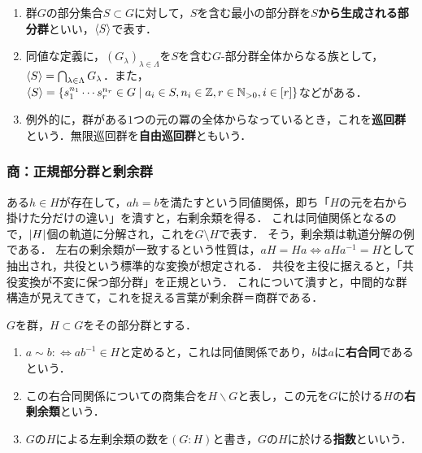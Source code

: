 \documentclass[uplatex,dvipdfmx]{jsreport}
\begin{document}
\begin{definition}\mbox{}
    \begin{enumerate}
        \item 群$G$の部分集合$S\subset G$に対して，$S$を含む最小の部分群を\textbf{$S$から生成される部分群}といい，$\langle S\rangle$で表す．
        \item 同値な定義に，$(G_\lambda)_{\lambda\in\Lambda}$を$S$を含む$G$-部分群全体からなる族として，$\langle S\rangle=\bigcap_{\lambda\in\Lambda} G_\lambda$．また，$\langle S\rangle=\{s_1^{n_1}\cdots s_r^{n_r}\in G\mid a_i\in S,n_i\in\mathbb{Z},r\in\mathbb{N}_{>0},i\in[r]\}$などがある．
        \item 例外的に，群がある$1$つの元の冪の全体からなっているとき，これを\textbf{巡回群}という．無限巡回群を\textbf{自由巡回群}ともいう．
    \end{enumerate}
\end{definition}

\subsubsection{商：正規部分群と剰余群}

\begin{tcolorbox}[colframe=ForestGreen, colback=ForestGreen!10!white, breakable ,colbacktitle=ForestGreen!40!white, coltitle=black,fonttitle=\bfseries\sffamily,
    title=]
    ある$h\in H$が存在して，$ah=b$を満たすという同値関係，即ち「$H$の元を右から掛けた分だけの違い」を潰すと，右剰余類を得る．
    これは同値関係となるので，$\lvert H\rvert$個の軌道に分解され，これを$G\setminus H$で表す．
    そう，剰余類は軌道分解の例である．
    左右の剰余類が一致するという性質は，$aH=Ha\Leftrightarrow aHa^{-1}=H$として抽出され，共役という標準的な変換が想定される．
    共役を主役に据えると，「共役変換が不変に保つ部分群」を正規という．
    これについて潰すと，中間的な群構造が見えてきて，これを捉える言葉が剰余群＝商群である．
\end{tcolorbox}

\begin{definition}
    $G$を群，$H\subset G$をその部分群とする．
    \begin{enumerate}
        \item $a\sim b:\Leftrightarrow ab^{-1}\in H$と定めると，これは同値関係であり，$b$は$a$に\textbf{右合同}であるという．
        \item この右合同関係についての商集合を$H\backslash G$と表し，この元を$G$に於ける$H$の\textbf{右剰余類}という．
        \item $G$の$H$による左剰余類の数を$(G:H)$と書き，$G$の$H$に於ける\textbf{指数}といいう．
    \end{enumerate}
\end{definition}
\end{document}
